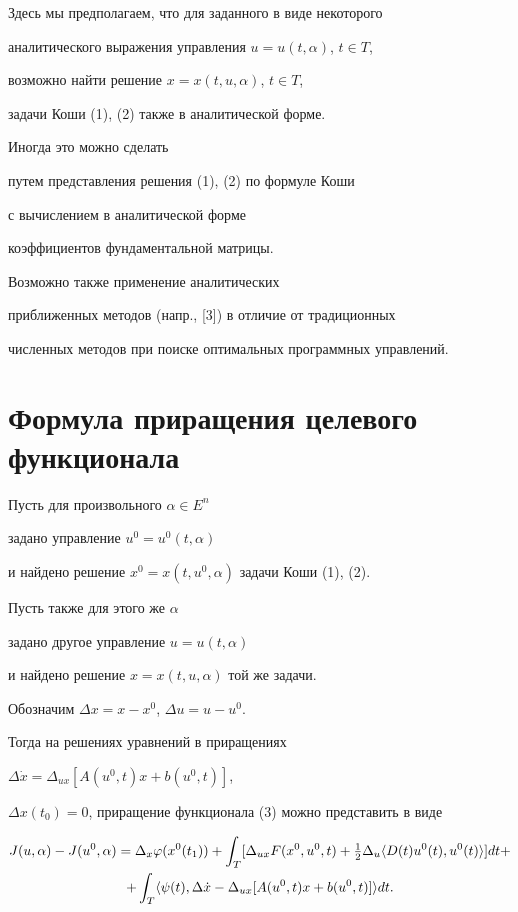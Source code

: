 \begin{note}


Здесь мы предполагаем, что для заданного в виде некоторого 


аналитического выражения управления $u=u(t,\alpha)$, $t\in T$, 


возможно найти решение $x=x(t,u,\alpha)$, $t\in T$,


задачи Коши (1), (2) также в аналитической форме. 


Иногда это можно сделать 


путем представления решения (1), (2) по формуле Коши 


с вычислением в аналитической форме 


коэффициентов фундаментальной матрицы. 


Возможно также применение аналитических 


приближенных методов (напр., [3]) в отличие от традиционных 


численных методов при поиске оптимальных программных управлений.


\end{note}





\section{Формула приращения целевого функционала}





Пусть для произвольного $\alpha\in E^n$ 


задано управление $u^0=u^0(t,\alpha)$


и найдено решение $x^0=x(t,u^0,\alpha)$ задачи Коши (1), (2).


Пусть также для этого же $\alpha$


задано другое управление $u=u(t,\alpha)$


и найдено решение $x=x(t,u,\alpha)$ той же задачи.


Обозначим $\Delta x=x-x^0$, $\Delta u=u-u^0$.


Тогда на решениях уравнений в приращениях


$\Delta \Dot x=\Delta_{ux}[A(u^0,t)x+b(u^0,t)]$,


$\Delta x(t_0)=0$, приращение функционала (3) можно представить в виде


\begin{multline}


J(u,\alpha)-J(u^0,\alpha)=\Delta_x \varphi (x^0(t_1))+


\int_T [\Delta_{ux}F(x^0,u^0,t)+


\tfrac{1}{2}\Delta_u \la D(t)u^0(t),u^0(t)\ra]dt+\\


%


+\int_T\la\psi(t),\Delta \Dot x-\Delta_{ux}[A(u^0,t)x+b(u^0,t)]\ra dt.


\end{multline} 



